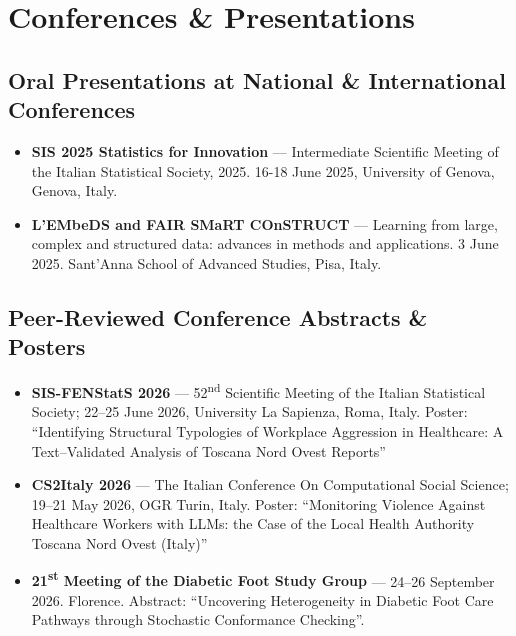 \documentclass[10pt,a4paper]{article}
\begin{document}
\newpage


\section{Conferences \& Presentations}

\subsection{Oral Presentations at National \& International Conferences}
\begin{itemize}
    \item \textbf{SIS 2025 Statistics for Innovation} --- Intermediate Scientific Meeting of the Italian Statistical Society, 2025.
    16-18 June 2025, University of Genova, Genova, Italy.
    \item \textbf{L’EMbeDS and FAIR SMaRT COnSTRUCT} --- Learning from large, complex and structured data: advances in methods and applications.
    3 June 2025. Sant'Anna School of Advanced Studies, Pisa, Italy.
\end{itemize}

\subsection{Peer-Reviewed Conference Abstracts \& Posters}
\begin{itemize}
    \item \textbf{SIS-FENStatS 2026} --- 52\textsuperscript{nd} Scientific Meeting of the Italian Statistical Society;
    22--25 June 2026, University La Sapienza, Roma, Italy. Poster: ``Identifying Structural Typologies of Workplace
    Aggression in Healthcare: A Text–Validated
    Analysis of Toscana Nord Ovest Reports''
    
    \item \textbf{CS2Italy 2026} --- The Italian Conference On Computational Social Science; 19--21 May 2026, OGR Turin, Italy. Poster: ``Monitoring Violence Against Healthcare Workers with LLMs: the Case of the Local Health Authority Toscana Nord Ovest (Italy)''
    
    \item \textbf{21\textsuperscript{st} Meeting of the Diabetic Foot Study Group} --- 24--26 September 2026. Florence. Abstract: ``Uncovering Heterogeneity in Diabetic Foot Care Pathways through Stochastic Conformance Checking''. 
\end{itemize}
\end{document}
